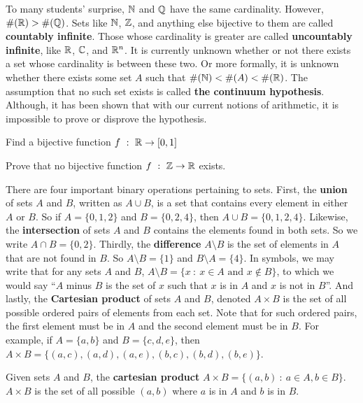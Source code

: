 To many students' surprise, $\mathbb{N}$ and $\mathbb{Q}$ have the same cardinality. However, $\#(\mathbb{R}) > \#(\mathbb{Q})$. Sets like $\mathbb{N}$, $\mathbb{Z}$, and anything else bijective to them are called \textbf{countably infinite}. Those whose cardinality is greater are called \textbf{uncountably infinite}, like $\mathbb{R}$, $\mathbb{C}$, and $\mathbb{R}^n$. It is currently unknown whether or not there exists a set whose cardinality is between these two. Or more formally, it is unknown whether there exists some set $A$ such that $\#(\mathbb{N})<\#(A)<\#(\mathbb{R})$. The assumption that no such set exists is called \textbf{the continuum hypothesis}. Although, it has been shown that with our current notions of arithmetic, it is impossible to prove or disprove the hypothesis. \\

\begin{exercise}
    Find a bijective function $f\ : \ \mathbb{R} \to [0,1]$
\end{exercise}
\vspace{-5mm}
\begin{exercise}[Challenge]
    Prove that no bijective function $f\ : \ \mathbb{Z} \to \mathbb{R}$ exists.
\end{exercise}

There are four important binary operations pertaining to sets. First, the \textbf{union} of sets $A$ and $B$, written as $A\cup B$, is a set that contains every element in either $A$ or $B$. So if $A=\{0,1,2\}$ and $B=\{0,2,4\}$, then $A\cup B=\{0,1,2,4\}$. Likewise, the \textbf{intersection} of sets $A$ and $B$ contains the elements found in both sets. So we write $A\cap B=\{0,2\}$. Thirdly, the \textbf{difference} $A \setminus B$ is the set of elements in $A$ that are not found in $B$. So $A \setminus B=\{1\}$ and $B \setminus A=\{4\}$. In symbols, we may write that for any sets $A$ and $B$, $A\setminus B=\{x\ :\ x\in A \text{ and } x\notin B\}$, to which we would say ``$A$ minus $B$ is the set of $x$ such that $x$ is in $A$ and $x$ is not in $B$''. And lastly, the \textbf{Cartesian product} of sets $A$ and $B$, denoted $A\times B$ is the set of all possible ordered pairs of elements from each set. Note that for such ordered pairs, the first element must be in $A$ and the second element must be in $B$. For example, if $A=\{a,b\}$ and $B=\{c,d,e\}$, then $A\times B = \{(a,c),(a,d),(a,e),(b,c),(b,d),(b,e)\}$. 

\begin{definition}
    Given sets $A$ and $B$, the \textbf{cartesian product}  $A\times B = \{(a,b)\ :\ a\in A, b\in B\}$. $A\times B$ is the set of all possible $(a,b)$ where $a$ is in $A$ and $b$ is in $B$.
\end{definition}

